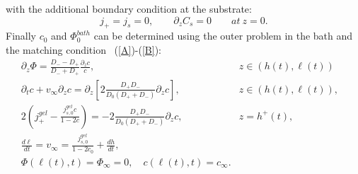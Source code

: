 \documentclass[12pt]{extarticle}
\begin{document}
with the additional boundary condition at the substrate:
\begin{equation}
j_+= j_s = 0, \qquad \partial_z C_s=0 \qquad at\  z=0.
\end{equation}
Finally $c_0$ and $\Phi^{bath}_0$ can be determined using the outer problem in the bath and the matching condition ~(\ref{A})-(\ref{B}):
\begin{eqnarray}
 \partial_z \Phi = \frac{D_--D_+}{D_-+D_+} \frac{\partial_z c}{c}, &z\in\left(h(t),\ell(t)\right)&\\
\partial_t c + v_\infty \partial_z c= \partial_z\left[2\frac{D_+D_-}{D_0(D_++D_-)}  \partial_z c\right], &z\in\left(h(t),\ell(t)\right),&\\
2\left(j^{gel}_+-\frac{j_{s,0}^{gel}c}{1-2c}\right) =- 2 \frac{D_+D_-}{D_0(D_++D_-)}\partial_z c, & z=h^+(t),&\\
\frac{d\ell}{dt}=v_\infty=\frac{j^{gel}_{s,0}}{1-2c_0}+\frac{dh}{dt},\\
\Phi(\ell(t),t)=\Phi_\infty=0,\quad c(\ell(t),t)=c_\infty.
\end{eqnarray}
\end{document}
